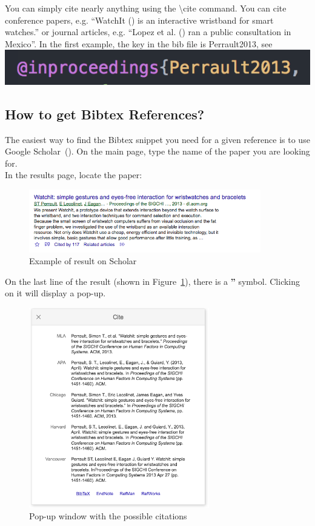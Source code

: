 You can simply cite nearly anything using the \textbackslash{}cite command.
You can cite conference papers, e.g. ``WatchIt (\cite{Perrault2013}) is an interactive wristband for smart watches.'' or journal articles, e.g. ``Lopez et al. (\cite{Lopez2017}) ran a public consultation in Mexico''.
In the first example, the key in the bib file is Perrault2013, see\\
\includegraphics{figures/bibtexkey}

\subsection{How to get Bibtex References?}
The easiest way to find the Bibtex snippet you need for a given reference is to use Google Scholar~(\cite{Scholar}).
On the main page, type the name of the paper you are looking for.
\\

In the results page, locate the paper:
\begin{figure}[!h]
  \centering
    \includegraphics[width=0.9\textwidth]{figures/scholarrefexample.png}
  \caption{Example of result on Scholar}
  \label{fig:scholarref}
\end{figure}

On the last line of the result (shown in Figure~\ref{fig:scholarref}), there is a \textbf{''} symbol.
Clicking on it will display a pop-up.
\begin{figure}[!h]
  \centering
    \includegraphics[width=0.7\textwidth]{figures/scholarpopup.png}
  \caption{Pop-up window with the possible citations}
  \label{fig:scholarpopup}
\end{figure}
\\

